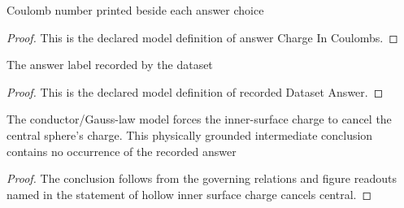 \begin{definition}
  \label{def:physics:phyx-mini-0852:phyxminiproblems-problemphyxmini0852-answerchargeincoulombs}
  Coulomb number printed beside each answer choice
\end{definition}
\begin{proof}
  This is the declared model definition of answer Charge In Coulombs.
\end{proof}
\begin{definition}
  \label{def:physics:phyx-mini-0852:phyxminiproblems-problemphyxmini0852-recordeddatasetanswer}
  The answer label recorded by the dataset
\end{definition}
\begin{proof}
  This is the declared model definition of recorded Dataset Answer.
\end{proof}
\begin{lemma}
  \label{lem:physics:phyx-mini-0852:phyxminiproblems-problemphyxmini0852-hollow-inner-surface-charge-cancels-central}
  The conductor/Gauss-law model forces the inner-surface charge to cancel the central sphere's charge. This physically grounded intermediate conclusion contains no occurrence of the recorded answer
\end{lemma}
\begin{proof}
  The conclusion follows from the governing relations and figure readouts named in the statement of hollow inner surface charge cancels central.
\end{proof}
